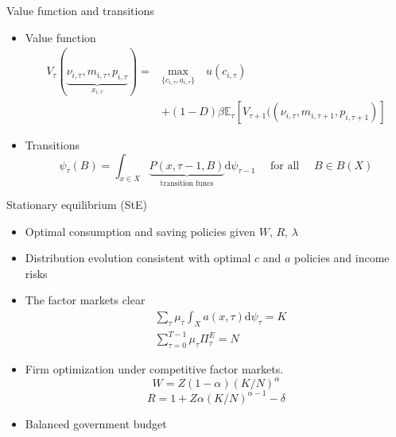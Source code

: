 \documentclass{beamer}
\begin{document}
\begin{frame}{Value function and transitions}
	\begin{itemize}
		\item Value function
		\begin{equation*}
			\begin{split}
				V_{\tau}(\underbrace{\nu_{i,\tau}, m_{i,\tau}, p_{i,\tau}}_{x_{i,\tau}})  =  & \underset{\{c_{i,\tau},a_{i,\tau}\}}{\textrm{max}} \quad   u(c_{i,\tau}) \\
		& +  (1-D)\beta \mathbb{E}_{\tau}\left[V_{\tau+1}((\nu_{i,\tau},m_{i,\tau+1}, p_{i,\tau+1})\right] 
			\end{split}
		\end{equation*}
	
	\item Transitions
		\begin{equation*}
		\label{Eq:DistDyn}
		\psi_{\tau}(B)=\int_{x \in X} \underbrace{P(x, \tau-1, B)}_{\text{transition funcs}}  \mathrm{d}\psi_{\tau-1} \quad \text { for all } \quad B\in B(X)
	\end{equation*}
	
	\end{itemize}
\end{frame}


\begin{frame}{Stationary equilibrium (StE)}
\begin{itemize}
	\item Optimal consumption and saving policies given $W$, $R$, $\lambda$
	\item Distribution evolution consistent with optimal $c$ and $a$ policies and income risks
	\item The factor markets clear 
	\begin{equation*}
	\begin{split}
		& \sum_{\tau} \mu_{\tau} \int_{X}a(x, \tau) \mathrm{d} \psi_{\tau}=K \\
		& \sum^{T-1}_{\tau=0} \mu_{\tau} \Pi^E_\tau= N
	\end{split}
	\end{equation*}
\item Firm optimization under competitive factor markets.
$$W = Z(1-\alpha) (K/N)^\alpha $$
$$R = 1+Z\alpha (K/N)^{\alpha-1} - \delta$$
\item Balanced government budget 
\end{itemize}
\end{frame}
\end{document}
